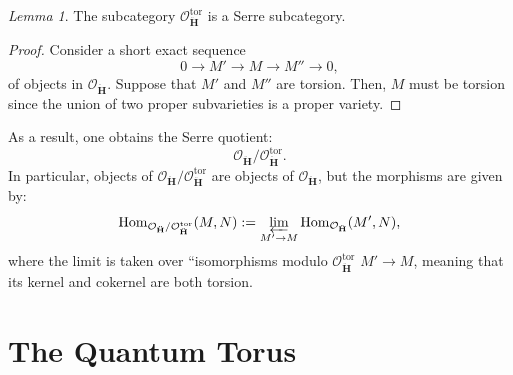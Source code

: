 \documentclass[a4paper]{report}
\theoremstyle{theorem}
\theoremstyle{definition}
\theoremstyle{remark}
\theoremstyle{proposition}
\theoremstyle{conjecture}
\theoremstyle{lemma}
\newtheorem{lemma}{Lemma}
\theoremstyle{corollary}
\theoremstyle{exercise}
\theoremstyle{example}
\newcommand{\mcal}{\mathcal}
\newcommand{\on}{\operatorname}
\begin{document}
  \begin{lemma}
      The subcategory $\mcal{O}_{\mathbf{\ddot{\mathbf{H}}}}^{\on{tor}}$ is a Serre subcategory.
  \end{lemma}
  
  \begin{proof}
     Consider a short exact sequence 
     $$0 \longrightarrow M' \longrightarrow M \longrightarrow M'' \longrightarrow 0,$$
     of objects in $\mcal{O}_{\mathbf{\ddot{\mathbf{H}}}}$. Suppose that $M'$ and $M''$
     are torsion. Then, $M$ must be torsion since the union of two proper 
     subvarieties is a proper variety.
  \end{proof}
  
  As a result, one obtains the Serre quotient:
  $$\mcal{O}_{\mathbf{\ddot{\mathbf{H}}}}/\mcal{O}_{\ddot{\mathbf{H}}}^{\on{tor}}.$$
  In particular, objects of $\mcal{O}_{\mathbf{\ddot{\mathbf{H}}}}/\mcal{O}_{\ddot{\mathbf{H}}}^{\on{tor}}$ are objects of $\mcal{O}_{\ddot{\mathbf{H}}}$, but the morphisms
  are given by:
  $$\on{Hom}_{\mcal{O}_{\mathbf{\ddot{\mathbf{H}}}}/\mcal{O}_{\ddot{\mathbf{H}}}^{\on{tor}}}(M,N) := \varprojlim_{M' \to M} \on{Hom}_{\mcal{O}_{\ddot{\mathbf{H}}}}(M',N),$$
  where the limit is taken over ``isomorphisms modulo $\mcal{O}_{\mathbf{\ddot{\mathbf{H}}}}^{\on{tor}}$ $M' \to M$, meaning that its kernel and cokernel are both torsion.
  
  
  
  \chapter{The Quantum Torus}\label{chap3}
  
\end{document}
